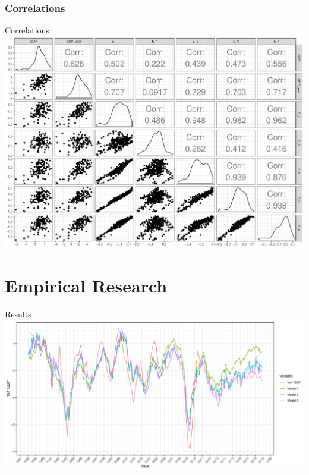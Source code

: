\documentclass[]{beamer}
\begin{document}
\subsubsection{Correlations}
\begin{frame}{Correlations}
    \centering
        \includegraphics[scale=0.3]{Graphs/ggpairs.pdf}
\end{frame}

\section{Empirical Research}
\begin{frame}{Results}
    \centering
        \includegraphics[scale=0.35]{Graphs/predictions1.pdf}
\end{frame}
\end{document}
